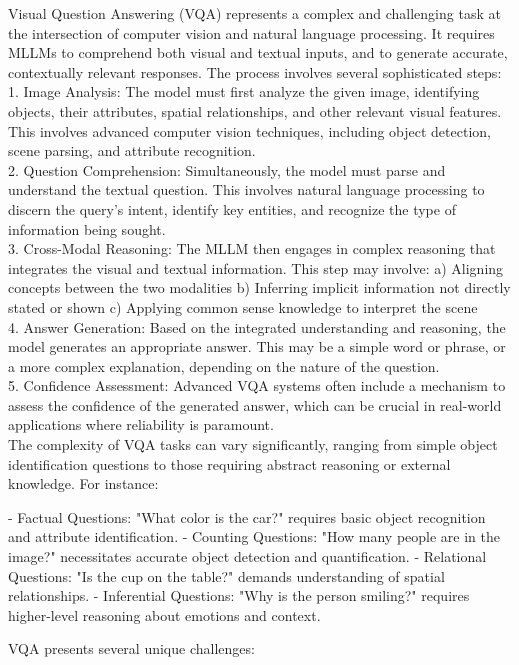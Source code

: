 Visual Question Answering (VQA) represents a complex and challenging task at the intersection of computer vision and natural language processing. It requires MLLMs to comprehend both visual and textual inputs, and to generate accurate, contextually relevant responses. The process involves several sophisticated steps:
\\
1. Image Analysis: The model must first analyze the given image, identifying objects, their attributes, spatial relationships, and other relevant visual features. This involves advanced computer vision techniques, including object detection, scene parsing, and attribute recognition.
\\
2. Question Comprehension: Simultaneously, the model must parse and understand the textual question. This involves natural language processing to discern the query's intent, identify key entities, and recognize the type of information being sought.
\\
3. Cross-Modal Reasoning: The MLLM then engages in complex reasoning that integrates the visual and textual information. This step may involve:
   a) Aligning concepts between the two modalities
   b) Inferring implicit information not directly stated or shown
   c) Applying common sense knowledge to interpret the scene
\\
4. Answer Generation: Based on the integrated understanding and reasoning, the model generates an appropriate answer. This may be a simple word or phrase, or a more complex explanation, depending on the nature of the question.
\\
5. Confidence Assessment: Advanced VQA systems often include a mechanism to assess the confidence of the generated answer, which can be crucial in real-world applications where reliability is paramount.
\\
The complexity of VQA tasks can vary significantly, ranging from simple object identification questions to those requiring abstract reasoning or external knowledge. For instance:

- Factual Questions: "What color is the car?" requires basic object recognition and attribute identification.
- Counting Questions: "How many people are in the image?" necessitates accurate object detection and quantification.
- Relational Questions: "Is the cup on the table?" demands understanding of spatial relationships.
- Inferential Questions: "Why is the person smiling?" requires higher-level reasoning about emotions and context.

VQA presents several unique challenges:

